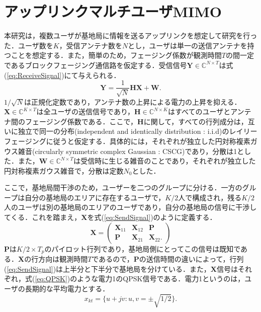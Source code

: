 \section{アップリンクマルチユーザMIMO}
本研究は，複数ユーザが基地局に情報を送るアップリンクを想定して研究を行った．ユーザ数を$K$，受信アンテナ数を$N$とし，ユーザは単一の送信アンテナを持つことを想定する．また，簡単のため，フェージング係数が観測時間$T$の間一定であるブロックフェージング通信路を仮定する．受信信号$\boldsymbol{Y}\in\mathbb{C}^{N\times T}$は式(\ref{eq:ReceiveSignal})にて与えられる．
\begin{equation} 
	\label{eq:ReceiveSignal}
	\boldsymbol{Y} = \frac{1}{\sqrt{N}}\boldsymbol{HX+W}.
\end{equation}
$1/\sqrt{N}$は正規化定数であり，アンテナ数の上昇による電力の上昇を抑える．$\boldsymbol{X}\in\mathbb{C}^{K\times T}$は全ユーザの送信信号であり，$\boldsymbol{H}\in\mathbb{C}^{N\times K}$はすべてのユーザとアンテナ間のフェージング係数である．ここで，$\boldsymbol{H}$に関して，すべての行列成分は，互いに独立で同一の分布(independent and identically distribution : i.i.d)のレイリーフェージングに従うと仮定する．具体的には，それぞれが独立した円対称複素ガウス雑音(circularly symmetric complex Gaussian : CSCG)であり，分散は1とした．また，$\boldsymbol{W}\in\mathbb{C}^{N\times T}$は受信時に生じる雑音のことであり，それぞれが独立した円対称複素ガウス雑音で，分散は定数$N_0$とした．

ここで，基地局間干渉のため，ユーザーを二つのグループに分ける．一方のグループは自分の基地局のエリアに存在するユーザで，$K/2$人で構成され，残る$K/2$人のユーザは別の基地局のエリアのユーザであり，自分の基地局の信号に干渉してくる．これを踏まえ，$\boldsymbol{X}$を式(\ref{eq:SendSignal})のように定義する．
\begin{equation} 
	\label{eq:SendSignal}
	\boldsymbol{X} =  \left(
		\begin{array}{cccc}
			\boldsymbol{X}_{11} &\boldsymbol{X}_{12} &\boldsymbol{P}\\
			\boldsymbol{P} &\boldsymbol{X}_{21} &\boldsymbol{X}_{22}.
		\end{array}
	\right)
\end{equation}
$\boldsymbol{P}$は$K/2\times T_{p}$のパイロット行列であり，基地局側にとってこの信号は既知である．$\boldsymbol{X}$の行方向は観測時間$T$であるので，$\boldsymbol{P}$の送信時間の違いによって，行列(\ref{eq:SendSignal})は上半分と下半分で基地局を分けている．また，$\boldsymbol{X}$信号はそれぞれ，式(\ref{eq:QPSK})のような電力1のQPSK信号である．電力1というのは，ユーザの長期的な平均電力とする．
\begin{equation} 
	\label{eq:QPSK}
	x_{kt} = \{u+jv:u,v=\pm\sqrt{1/2}\}.
\end{equation}

